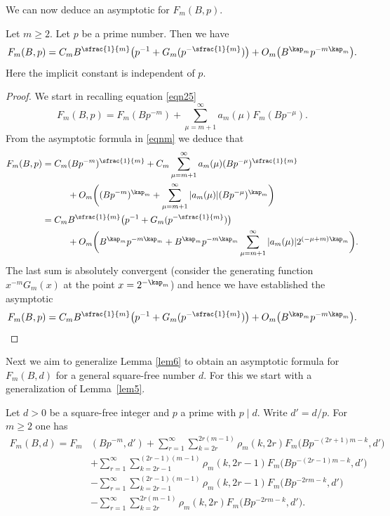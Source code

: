 We can now deduce an asymptotic for $F_m(B,p)$.

\begin{lemma}\label{lem6}
Let $m\geq 2$.
Let $p$ be a prime number. Then we have
\[
F_m(B,p)=C_mB^{\sfrac{1}{m}} \bigl(p^{-1}+G_m(p^{-\sfrac{1}{m}})\bigr)+ O_m\bigl(B^{\kap_m}p^{-m\kap_m}\bigr).
\]
Here the implicit constant is independent of $p$.
\end{lemma}

\begin{proof}
We start in recalling equation \eqref{eqn25}
\begin{equation*}
F_m(B,p) = F_m(Bp^{-m}) +\sum_{\mu=m+1}^\infty a_m(\mu) F_m(Bp^{-\mu}).
\end{equation*}
From the asymptotic formula in \eqref{eqnm} we deduce that
\begin{equation*}
\begin{split}
F_m(B,p) =C_m&(Bp^{-m})^{\sfrac{1}{m}} +C_m\sum_{\mu=m+1}^\infty a_m(\mu) (Bp^{-\mu})^{\sfrac{1}{m}}\\ &+O_m\biggl((Bp^{-m})^{\kap_m}+ \sum_{\mu=m+1}^\infty |a_m(\mu)| (Bp^{-\mu})^{\kap_m} \biggr)\\
= C_m&B^{\sfrac{1}{m}} \bigl(p^{-1}+G_m(p^{-\sfrac{1}{m}})\bigr)\\& +O_m\biggl(B^{\kap_m}p^{-m\kap_m}+B^{\kap_m}p^{-m\kap_m}\sum_{\mu=m+1}^{\infty}|a_m(\mu)|2^{(-\mu+m)\kap_m}\biggr).
\end{split}
\end{equation*}
The last sum is absolutely convergent (consider the generating function $x^{-m}G_m(x)$ at the point $x=2^{-\kap_m}$) and hence we have established the asymptotic
\[
F_m(B,p)=C_mB^{\sfrac{1}{m}} \bigl(p^{-1}+G_m(p^{-\sfrac{1}{m}})\bigr)+ O_m\bigl(B^{\kap_m}p^{-m\kap_m}\bigr). \qedhere
\]
\end{proof}

Next we aim to generalize Lemma \ref{lem6} to obtain an asymptotic formula for $F_m(B,d)$ for a general square-free number $d$. For this we start with a generalization of Lemma~\ref{lem5}.

\begin{lemma}\label{lem7}
Let $d>0$ be a square-free integer and $p$ a prime with $p\mid d$. Write $d'=d/p$. For $m\geq 2$ one has
\begin{equation*}
\begin{split}
F_m(B,d) =F_m&(Bp^{-m},d') +\sum_{r=1}^{\infty} \sum_{k=2r}^{2r(m-1)}\rho_m(k,2r)F_m\bigl(Bp^{-(2r+1)m-k},d'\bigr)\\
&+ \sum_{r=1}^\infty\sum_{k=2r-1}^{(2r-1)(m-1)}\rho_m(k,2r-1)F_m\bigl(Bp^{-(2r-1)m-k},d'\bigr)\\
&-\sum_{r=1}^\infty \sum_{k=2r-1}^{(2r-1)(m-1)}\rho_m(k,2r-1)F_m\bigl(Bp^{-2rm-k},d'\bigr)\\
&-\sum_{r=1}^\infty\sum_{k=2r}^{2r(m-1)}\rho_m(k,2r)F_m\bigl(Bp^{-2rm-k},d'\bigr).
\end{split}
\end{equation*}
\end{lemma}

